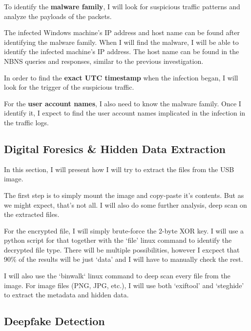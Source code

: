 \documentclass[pdflatex,sn-mathphys-num]{sn-jnl}
\begin{document}
\par To identify the \textbf{malware family}, I will look for suspicious traffic patterns and analyze the payloads of
the packets.

\par The infected Windows machine's IP address and host name can be found after identifying the malware family. When I
will find the malware, I will be able to identify the infected machine's IP address. The host name can be found in the
NBNS queries and responses, similar to the previous investigation.

\par In order to find the \textbf{exact UTC timestamp} when the infection began, I will look for the trigger of the
suspicious traffic.

\par For the \textbf{user account names}, I also need to know the malware family. Once I identify it, I expect to find
the user account names implicated in the infection in the traffic logs.

\subsection{Digital Foresics \& Hidden Data Extraction}\label{dfhde}

\par In this section, I will present how I will try to extract the files from the USB image.

\par The first step is to simply mount the image and copy-paste it's contents. But as we might expect, that's not all.
I will also do some further analysis, deep scan on the extracted files.

\par For the encrypted file, I will simply brute-force the 2-byte XOR key. I will use a python script for that together
with the `file' linux command to identify the decrypted file type. There will be multiple possibilities, however I
excpect that 90\% of the results will be just `data' and I will have to manually check the rest.

\par I will also use the `binwalk` linux command to deep scan every file from the image. For image files (PNG, JPG, etc.),
I will use both `exiftool'\cite{suhardjono2022forensic} and `steghide' to extract the metadata and hidden data.

\subsection{Deepfake Detection}
\end{document}
